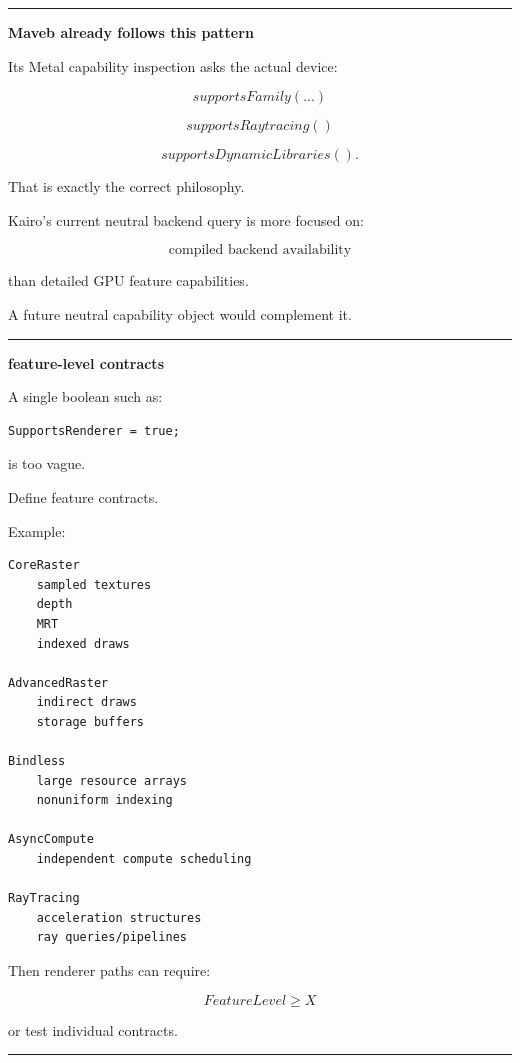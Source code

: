 \begin{center}\rule{0.5\linewidth}{0.5pt}\end{center}

\textbf{Maveb already follows this pattern}

Its Metal capability inspection asks the actual device:

\[
supportsFamily(...)
\]

\[
supportsRaytracing()
\]

\[
supportsDynamicLibraries().
\]

That is exactly the correct philosophy.

Kairo's current neutral backend query is more focused on:

\[
\text{compiled backend availability}
\]

than detailed GPU feature capabilities.

A future neutral capability object would complement it.

\begin{center}\rule{0.5\linewidth}{0.5pt}\end{center}

\textbf{feature-level contracts}

A single boolean such as:

\begin{verbatim}
SupportsRenderer = true;
\end{verbatim}

is too vague.

Define feature contracts.

Example:

\begin{verbatim}
CoreRaster
    sampled textures
    depth
    MRT
    indexed draws

AdvancedRaster
    indirect draws
    storage buffers

Bindless
    large resource arrays
    nonuniform indexing

AsyncCompute
    independent compute scheduling

RayTracing
    acceleration structures
    ray queries/pipelines
\end{verbatim}

Then renderer paths can require:

\[
FeatureLevel\ge X
\]

or test individual contracts.

\begin{center}\rule{0.5\linewidth}{0.5pt}\end{center}


